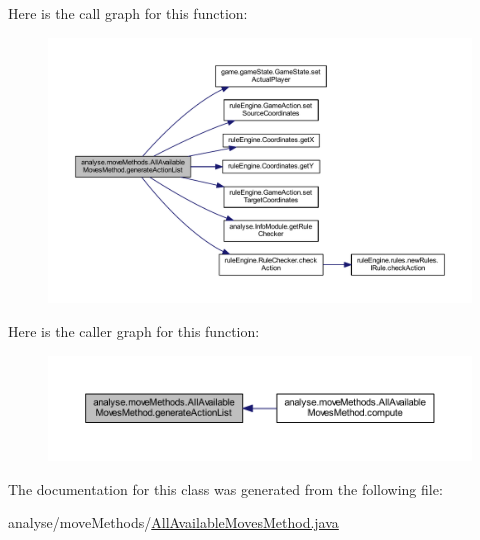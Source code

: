 Here is the call graph for this function\+:
\nopagebreak
\begin{figure}[H]
\begin{center}
\leavevmode
\includegraphics[width=350pt]{classanalyse_1_1move_methods_1_1_all_available_moves_method_a1b46ec313b796fcea3764e71e5d427c9_cgraph}
\end{center}
\end{figure}
Here is the caller graph for this function\+:
\nopagebreak
\begin{figure}[H]
\begin{center}
\leavevmode
\includegraphics[width=350pt]{classanalyse_1_1move_methods_1_1_all_available_moves_method_a1b46ec313b796fcea3764e71e5d427c9_icgraph}
\end{center}
\end{figure}


The documentation for this class was generated from the following file\+:\begin{DoxyCompactItemize}
\item 
analyse/move\+Methods/\mbox{\hyperlink{_all_available_moves_method_8java}{All\+Available\+Moves\+Method.\+java}}\end{DoxyCompactItemize}
